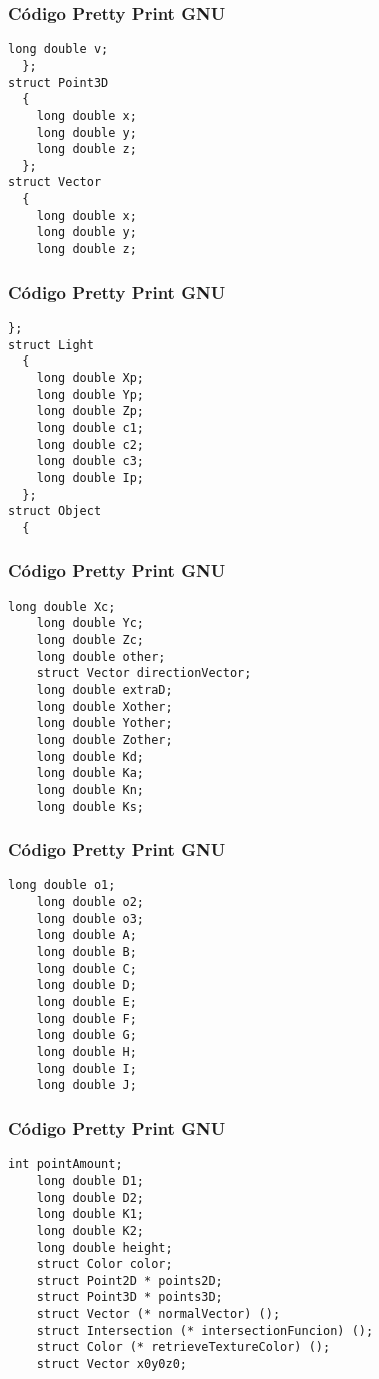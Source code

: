 \documentclass{beamer}
\begin{document}
\begin{frame}[fragile]
\frametitle{C\'odigo Pretty Print GNU}
\begin{lstlisting}[style=CStyle]
    long double v;
  };
struct Point3D
  {
    long double x;
    long double y;
    long double z;
  };
struct Vector
  {
    long double x;
    long double y;
    long double z;
\end{lstlisting}
\end{frame}
\begin{frame}[fragile]
\frametitle{C\'odigo Pretty Print GNU}
\begin{lstlisting}[style=CStyle]
  };
struct Light
  {
    long double Xp;
    long double Yp;
    long double Zp;
    long double c1;
    long double c2;
    long double c3;
    long double Ip;
  };
struct Object
  {
    \end{lstlisting}
\end{frame}
\begin{frame}[fragile]
\frametitle{C\'odigo Pretty Print GNU}
\begin{lstlisting}[style=CStyle]
    long double Xc;
    long double Yc;
    long double Zc;
    long double other;
    struct Vector directionVector;
    long double extraD;
    long double Xother;
    long double Yother;
    long double Zother;
    long double Kd;
    long double Ka;
    long double Kn;
    long double Ks;
\end{lstlisting}
\end{frame}
\begin{frame}[fragile]
\frametitle{C\'odigo Pretty Print GNU}
\begin{lstlisting}[style=CStyle]
    long double o1;
    long double o2;
    long double o3;
    long double A;
    long double B;
    long double C;
    long double D;
    long double E;
    long double F;
    long double G;
    long double H;
    long double I;
    long double J;
\end{lstlisting}
\end{frame}
\begin{frame}[fragile]
\frametitle{C\'odigo Pretty Print GNU}
\begin{lstlisting}[style=CStyle]
    int pointAmount;
    long double D1;
    long double D2;
    long double K1;
    long double K2;
    long double height;
    struct Color color;
    struct Point2D * points2D;
    struct Point3D * points3D;
    struct Vector (* normalVector) ();
    struct Intersection (* intersectionFuncion) ();
    struct Color (* retrieveTextureColor) ();
    struct Vector x0y0z0;
\end{lstlisting}
\end{frame}
\end{document}
